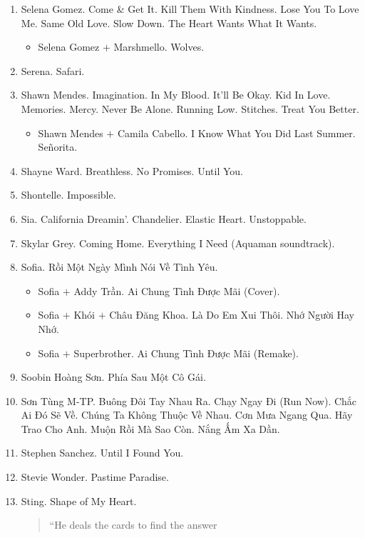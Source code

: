 \documentclass{article}
\begin{document}
\begin{enumerate}
\begin{itemize}
	\end{itemize}
	\item {\sc Selena Gomez.} Come \& Get It. Kill Them With Kindness. Lose You To Love Me. Same Old Love. Slow Down. The Heart Wants What It Wants.
	\begin{itemize}
		\item {\sc Selena Gomez $+$ Marshmello.} Wolves.
	\end{itemize}
	\item {\sc Serena.} Safari.
	\item {\sc Shawn Mendes.} Imagination. In My Blood. It'll Be Okay. Kid In Love. Memories. Mercy. Never Be Alone. Running Low. Stitches. Treat You Better.
	\begin{itemize}
		\item {\sc Shawn Mendes $+$ Camila Cabello.} I Know What You Did Last Summer. Se\~norita.
	\end{itemize}
	\item {\sc Shayne Ward.} Breathless. No Promises. Until You.
	\item {\sc Shontelle.} Impossible.
	\item {\sc Sia.} California Dreamin'. Chandelier. Elastic Heart. Unstoppable.
	\item {\sc Skylar Grey.} Coming Home. Everything I Need (Aquaman soundtrack).
	\item {\sc Sofia.} Rồi Một Ngày Mình Nói Về Tình Yêu.
	\begin{itemize}
		\item {\sc Sofia $+$ Addy Trần.} Ai Chung Tình Được Mãi (Cover).
		\item {\sc Sofia $+$ Khói $+$ Châu Đăng Khoa.} Là Do Em Xui Thôi. Nhớ Người Hay Nhớ.
		\item {\sc Sofia $+$ Superbrother.} Ai Chung Tình Được Mãi (Remake).
	\end{itemize}
	\item {\sc Soobin Hoàng Sơn.} Phía Sau Một Cô Gái.
	\item {\sc Sơn Tùng M-TP.} Buông Đôi Tay Nhau Ra. Chạy Ngay Đi (Run Now). Chắc Ai Đó Sẽ Về. Chúng Ta Không Thuộc Về Nhau. Cơn Mưa Ngang Qua. Hãy Trao Cho Anh. Muộn Rồi Mà Sao Còn. Nắng Ấm Xa Dần.
	\item {\sc Stephen Sanchez.} Until I Found You.
	\item {\sc Stevie Wonder.} Pastime Paradise.
	\item {\sc Sting.} Shape of My Heart.
	\begin{quotation}
		``He deals the cards to find the answer
		

\end{quotation}
\end{enumerate}
\end{document}
